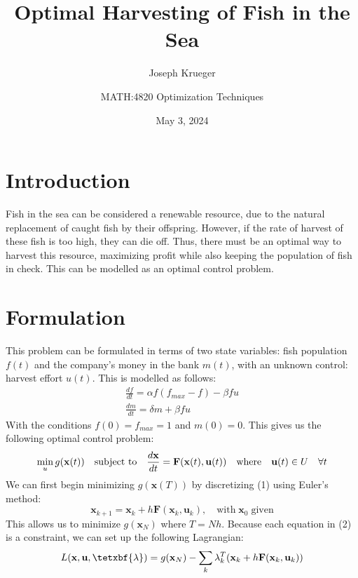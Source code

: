 \documentclass{article}
\title{Optimal Harvesting of Fish in the Sea}
\author{Joseph Krueger}
\date{May 3, 2024}
\author{MATH:4820 Optimization Techniques}
\begin{document}
\maketitle

\section{Introduction}
Fish in the sea can be considered a renewable resource, due to the natural replacement of caught fish by their offspring. However, if the rate of harvest of these fish is too high, they can die off. Thus, there must be an optimal way to harvest this resource, maximizing profit while also keeping the population of fish in check. This can be modelled as an optimal control problem.

\section{Formulation}
This problem can be formulated in terms of two state variables: fish population $f(t)$ and the company’s money in the bank $m(t)$, with an unknown control: harvest effort $u(t)$. This is modelled as follows:
\begin{equation}
\begin{align}
\frac{df}{dt}=\alpha f(f_{max}-f)-\beta f u \\
\frac{dm}{dt}=\delta m +\beta f u
\end{align}
\end{equation}
With the conditions $f(0)=f_{max}=1$ and $m(0)=0$. This gives us the following optimal control problem:
\begin{equation}
    \min_{u}g(\textbf{x}(t)) \quad \text{subject to} \quad \frac{d\textbf{x}}{dt}=\textbf{F}(\textbf{x}(t),\textbf{u}(t)) \\
    \quad \text{where} \quad \textbf{u}(t) \in U \quad \forall t
\end{equation}
We can first begin minimizing $g(\textbf{x}(T))$ by discretizing (1) using Euler’s method:
\begin{equation}
    \textbf{x}_{k+1}=\textbf{x}_{k}+h\textbf{F}(\textbf{x}_{k}, \textbf{u}_{k}), \quad \text{with} \; \textbf{x}_{0} \; \text{given}
\end{equation}
This allows us to minimize $g(\textbf{x}_N)$ where $T=Nh$. Because each equation in (2) is a constraint, we can set up the following Lagrangian:
\begin{equation}
    L(\textbf{x}, \textbf{u}, \tetxbf{\lambda})=g(\textbf{x}_N)-\sum_{k}\lambda_{k}^T(\textbf{x}_{k} + h\textbf{F}(\textbf{x}_{k},\textbf{u}_{k}))
\end{equation}
\end{document}
